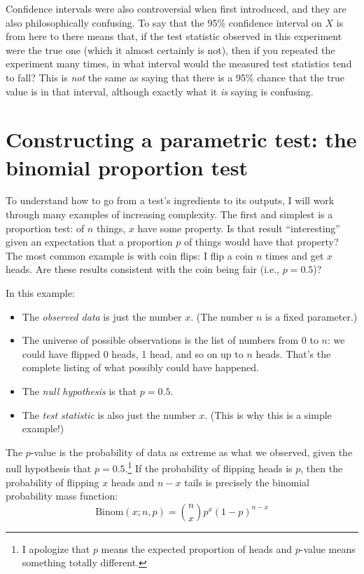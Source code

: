 Confidence intervals were also controversial when first introduced, and they are also philosophically confusing. To say that the 95\% confidence interval on $X$ is from here to there means that, if the test statistic observed in this experiment were the true one (which it almost certainly is not), then if you repeated the experiment many times, in what interval would the measured test statistics tend to fall? This is \emph{not} the same as saying that there is a 95\% chance that the true value is in that interval, although exactly what it \emph{is} saying is confusing.

\section{Constructing a parametric test: the binomial proportion test}

To understand how to go from a test's ingredients to its outputs, I will work
through many examples of increasing complexity. The first and simplest is a proportion test: of $n$ things, $x$ have some property. Is that result ``interesting'' given an expectation that a proportion $p$ of things would have that property? The most common example is with coin flips: I flip a coin $n$ times and get $x$ heads. Are these results consistent with the coin being fair (i.e., $p = 0.5$)?

In this example:
\begin{itemize}
\item The \emph{observed data} is just the number $x$. (The number $n$ is a fixed parameter.)
\item The universe of possible observations is the list of numbers from 0 to $n$: we could have flipped 0 heads, 1 head, and so on up to $n$ heads. That's the complete listing of what possibly could have happened.
\item The \emph{null hypothesis} is that $p = 0.5$.
\item The \emph{test statistic} is also just the number $x$. (This is why this is a simple example!)
\end{itemize}

The $p$-value is the probability of data as extreme as what we observed, given the null hypothesis that $p = 0.5$.\footnote{I apologize that $p$ means the expected proportion of heads and $p$-value means something totally different.} If the probability of flipping heads is $p$, then the probability of flipping $x$ heads and $n - x$ tails is precisely the binomial probability mass function:
\begin{equation}
\mathrm{Binom}(x; n, p) = \binom{n}{x} p^x (1-p)^{n-x}
\end{equation}


